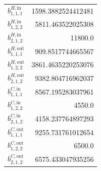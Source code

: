 \documentclass{article}%
\begin{document}
\begin{multicols*}{3}
\begin{supertabular}{lr}
	$b_{1,1,1}^{H,\text{in}}$ & 1598.3882524412481 \\%
	$b_{1,2,2}^{H,\text{in}}$ & 5811.463522025308 \\%
	$b_{2,1,2}^{H,\text{in}}$ & 11800.0 \\%
	$b_{1,1,1}^{H,\text{out}}$ & 909.8517744665567 \\%
	$b_{1,2,2}^{H,\text{out}}$ & 3861.4635220253076 \\%
	$b_{2,1,2}^{H,\text{out}}$ & 9382.804716962037 \\%
	$b_{1,1,1}^{C,\text{in}}$ & 8567.195283037961 \\%
	$b_{1,2,2}^{C,\text{in}}$ & 4550.0 \\%
	$b_{2,1,2}^{C,\text{in}}$ & 4158.237764897293 \\%
	$b_{1,1,1}^{C,\text{out}}$ & 9255.731761012654 \\%
	$b_{1,2,2}^{C,\text{out}}$ & 6500.0 \\%
	$b_{2,1,2}^{C,\text{out}}$ & 6575.433047935256 \\%
\end{supertabular}%
\end{multicols*}%
\clearpage%
\end{document}
